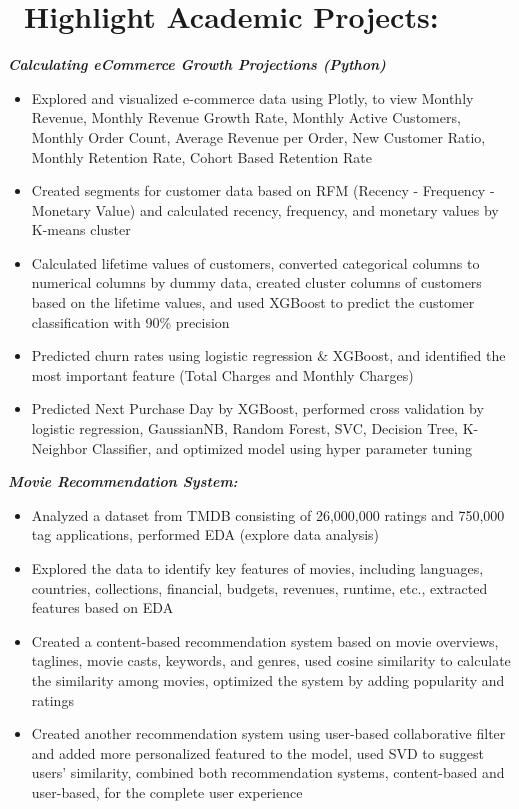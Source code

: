 \documentclass{resume}
\begin{document}
\section{%
        \texorpdfstring{\faInfo\ Highlight Academic Projects:}%
                        {-{}--Projects}}
\textbf{\textit{Calculating eCommerce Growth Projections (Python) }}
\begin{itemize}
  \item Explored and visualized e-commerce data using Plotly, to view Monthly Revenue, Monthly Revenue Growth Rate, Monthly Active Customers, Monthly Order Count, Average Revenue per Order, New Customer Ratio, Monthly Retention Rate, Cohort Based Retention Rate
  \item Created segments for customer data based on RFM (Recency - Frequency - Monetary Value) and calculated recency, frequency, and monetary values by K-means cluster
  \item Calculated lifetime values of customers, converted categorical columns to numerical columns by dummy data, created cluster columns of customers based on the lifetime values, and used XGBoost to predict the customer classification with 90\% precision
  \item Predicted churn rates using logistic regression \& XGBoost, and identified the most important feature (Total Charges and Monthly Charges) 
  \item Predicted Next Purchase Day by XGBoost, performed cross validation by logistic regression, GaussianNB, Random Forest, SVC, Decision Tree, K-Neighbor Classifier, and optimized model using hyper parameter tuning 
\end{itemize}

\textbf{\textit{Movie Recommendation System: }}
\begin{itemize}
  \item Analyzed a dataset from TMDB consisting of 26,000,000 ratings and 750,000 tag applications, performed EDA (explore data analysis) 
  \item Explored the data to identify key features of movies, including languages, countries, collections, financial, budgets, revenues, runtime, etc., extracted features based on EDA 
  \item Created a content-based recommendation system based on movie overviews, taglines, movie casts, keywords, and genres, used cosine similarity to calculate the similarity among movies, optimized the system by adding popularity and ratings
  \item Created another recommendation system using user-based collaborative filter and added more personalized featured to the model, used SVD to suggest users' similarity, combined both recommendation systems, content-based and user-based, for the complete user experience
\end{itemize}
\end{document}
